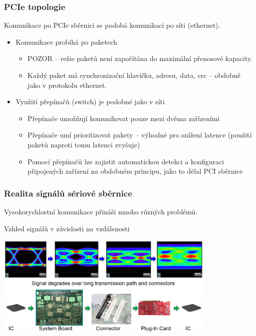 \documentclass{beamer}
\begin{document}
\begin{frame}
\frametitle{PCIe topologie}

Komunikace po PCIe sběrnici se podobá komunikaci po síti (ethernet).
\begin{itemize}
\item Komunikace probíhá po paketech 
\begin{itemize}
\item POZOR -- režie paketů není započítána do maximální přenosové kapacity.
\item Každý paket má synchronizační hlavičku, adresu, data, crc -- obdobně jako v protokolu ethernet.
\end{itemize}
\item Využití přepínačů (switch) je podobné jako v síti
\begin{itemize}
\item Přepínače umožňují komunikovat pouze mezi dvěma zařízeními
\item Přepínače umí prioritizovat pakety -- výhodné pro snížení latence (použití paketů naproti tomu latenci zvyšuje)
\item Pomocí přepínačů lze zajistit automatickou detekci a konfiguraci připojených zařízení na obdobném principu, jako to dělal PCI sběrnice 
\end{itemize}
\end{itemize}

\end{frame}

\begin{frame}
\frametitle{Realita signálů sériové sběrnice}

Vysokorychlostní komunikace přináší mnoho různých problémů.

Vzhled signálů v závislosti na vzdálenosti

\begin{center}
\includegraphics[width=0.8\textwidth]{fig/signals.png}
\end{center}

\end{frame}
\end{document}
